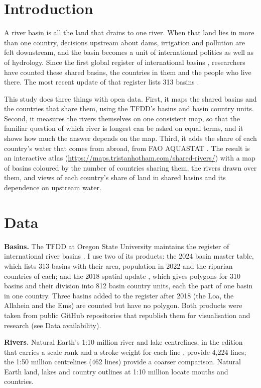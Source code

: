 \documentclass[11pt,a4paper]{article}
\begin{document}
\section{Introduction}
A river basin is all the land that drains to one river. When that land lies in more than one country, decisions upstream about dams, irrigation and pollution are felt downstream, and the basin becomes a unit of international politics as well as of hydrology. Since the first global register of international basins \citep{wolf1999}, researchers have counted these shared basins, the countries in them and the people who live there. The most recent update of that register lists 313 basins \citep{tfdd,mccracken2019}.

This study does three things with open data. First, it maps the shared basins and the countries that share them, using the TFDD's basins and basin country units. Second, it measures the rivers themselves on one consistent map, so that the familiar question of which river is longest can be asked on equal terms, and it shows how much the answer depends on the map. Third, it adds the share of each country's water that comes from abroad, from FAO AQUASTAT \citep{aquastat}. The result is an interactive atlas (\url{https://maps.tristanhotham.com/shared-rivers/}) with a map of basins coloured by the number of countries sharing them, the rivers drawn over them, and views of each country's share of land in shared basins and its dependence on upstream water.

\section{Data}
\textbf{Basins.} The TFDD at Oregon State University maintains the register of international river basins \citep{tfdd}. I use two of its products: the 2024 basin master table, which lists 313 basins with their area, population in 2022 and the riparian countries of each; and the 2018 spatial update \citep{mccracken2019}, which gives polygons for 310 basins and their division into 812 basin country units, each the part of one basin in one country. Three basins added to the register after 2018 (the Loa, the Allahein and the Ems) are counted but have no polygon. Both products were taken from public GitHub repositories that republish them for visualisation and research (see Data availability).

\textbf{Rivers.} Natural Earth's 1:10 million river and lake centrelines, in the edition that carries a scale rank and a stroke weight for each line \citep{naturalearth}, provide 4,224 lines; the 1:50 million centrelines (462 lines) provide a coarser comparison. Natural Earth land, lakes and country outlines at 1:10 million locate mouths and countries.
\end{document}
